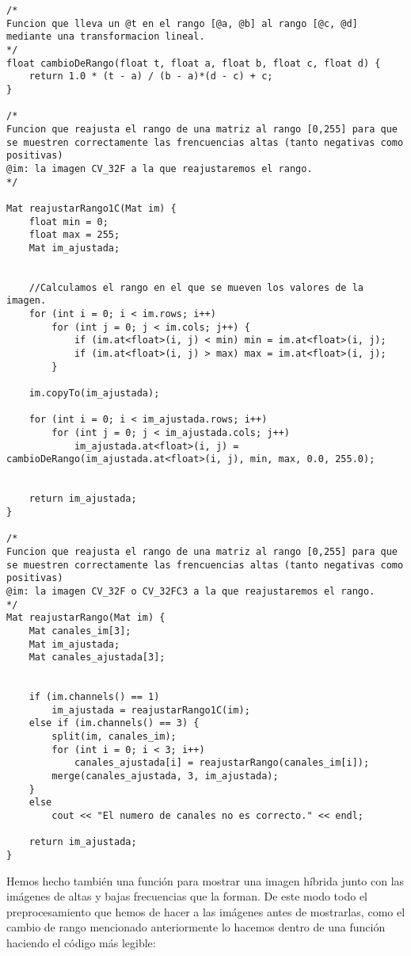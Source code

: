 \documentclass[10pt,a4paper]{article}
\begin{document}
\begin{lstlisting}
/*
Funcion que lleva un @t en el rango [@a, @b] al rango [@c, @d] mediante una transformacion lineal.
*/
float cambioDeRango(float t, float a, float b, float c, float d) {
	return 1.0 * (t - a) / (b - a)*(d - c) + c;	
}

/*
Funcion que reajusta el rango de una matriz al rango [0,255] para que se muestren correctamente las frencuencias altas (tanto negativas como positivas)
@im: la imagen CV_32F a la que reajustaremos el rango.
*/

Mat reajustarRango1C(Mat im) {
	float min = 0;
	float max = 255;
	Mat im_ajustada;


	//Calculamos el rango en el que se mueven los valores de la imagen.
	for (int i = 0; i < im.rows; i++)
		for (int j = 0; j < im.cols; j++) {
			if (im.at<float>(i, j) < min) min = im.at<float>(i, j);
			if (im.at<float>(i, j) > max) max = im.at<float>(i, j);
		}

	im.copyTo(im_ajustada);

	for (int i = 0; i < im_ajustada.rows; i++)
		for (int j = 0; j < im_ajustada.cols; j++)
			im_ajustada.at<float>(i, j) = cambioDeRango(im_ajustada.at<float>(i, j), min, max, 0.0, 255.0);


	return im_ajustada;
}

/*
Funcion que reajusta el rango de una matriz al rango [0,255] para que se muestren correctamente las frencuencias altas (tanto negativas como positivas)
@im: la imagen CV_32F o CV_32FC3 a la que reajustaremos el rango.
*/
Mat reajustarRango(Mat im) {
	Mat canales_im[3];
	Mat im_ajustada;
	Mat canales_ajustada[3];


	if (im.channels() == 1)
		im_ajustada = reajustarRango1C(im);
	else if (im.channels() == 3) {
		split(im, canales_im);
		for (int i = 0; i < 3; i++)
			canales_ajustada[i] = reajustarRango(canales_im[i]);
		merge(canales_ajustada, 3, im_ajustada);
	}
	else
		cout << "El numero de canales no es correcto." << endl;

	return im_ajustada;
}
\end{lstlisting}

Hemos hecho también una función para mostrar una imagen híbrida junto con las imágenes de altas y bajas frecuencias que la forman. De este modo todo el preprocesamiento que hemos de hacer a las imágenes antes de mostrarlas, como el cambio de rango mencionado anteriormente lo hacemos dentro de una función haciendo el código más legible:\\
\end{document}
